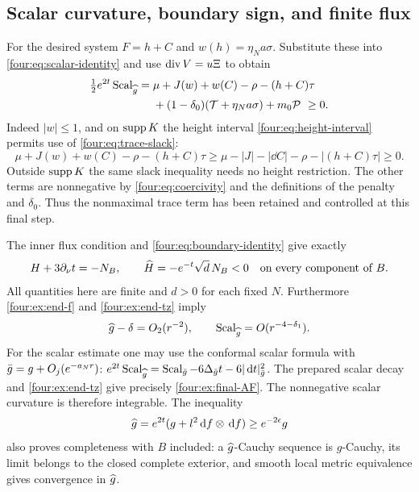 \subsection{Scalar curvature, boundary sign, and finite flux}

For the desired system $F=h+C$ and
$w(h)=\eta_N a\sigma$.  Substitute these into
\eqref{four:eq:scalar-identity} and use $\operatorname{div} V=u\Xi$ to obtain
\begin{equation}\label{four:ex:positive-scalar}
 \begin{split}
 \tfrac12e^{2t}\operatorname{Scal}_{\widehat g}
 ={}&\mu+J(w)+w(C)-\rho-(h+C)\tau\\
 &+(1-\delta_0)(\mathcal T+\eta_N a\sigma)+m_0\mathcal P\ \ge0.
 \end{split}
\end{equation}
Indeed $|w|\le1$, and on $\operatorname{supp} K$ the height interval
\eqref{four:eq:height-interval} permits use of \eqref{four:eq:trace-slack}:
\[
 \mu+J(w)+w(C)-\rho-(h+C)\tau
 \ge\mu-|J|-|\dd C|-\rho-|(h+C)\tau|\ge0.
\]
Outside $\operatorname{supp} K$ the same slack inequality needs no height restriction.
The other terms are nonnegative by \eqref{four:eq:coercivity} and the
definitions of the penalty and $\delta_0$.  Thus the nonmaximal trace
term has been retained and controlled at this final step.

The inner flux condition and \eqref{four:eq:boundary-identity} give exactly
\begin{equation}\label{four:ex:negative-boundary}
 H+3\partial_\nu t=-N_B,
 \qquad \widehat H=-e^{-t}\sqrt d\,N_B<0
 \quad\hbox{on every component of }B.
\end{equation}
All quantities here are finite and $d>0$ for each fixed $N$.
Furthermore \eqref{four:ex:end-f} and \eqref{four:ex:end-tz} imply
\begin{equation}\label{four:ex:final-AF}
 \widehat g-\delta=O_2(r^{-2}),\qquad
 \operatorname{Scal}_{\widehat g}=O(r^{-4-\delta_1}).
\end{equation}
For the scalar estimate one may use the conformal scalar formula
with $\bar g=g+O_j(e^{-a_Nr})$:
$e^{2t}\operatorname{Scal}_{\widehat g}=\operatorname{Scal}_{\bar g}-6\Delta_{\bar g}t
-6|\,\mathrm d t|_{\bar g}^2$.  The prepared scalar decay and
\eqref{four:ex:end-tz} give precisely \eqref{four:ex:final-AF}.
The nonnegative scalar curvature is therefore integrable.
The inequality
\begin{equation}\label{four:ex:metric-comparison}
 \widehat g=e^{2t}(g+l^2\,\mathrm d f\otimes\,\mathrm d f)\ge e^{-2\epsilon}g
\end{equation}
also proves completeness with $B$ included: a $\widehat g$-Cauchy sequence
is $g$-Cauchy, its limit belongs to the closed complete exterior, and
smooth local metric equivalence gives convergence in $\widehat g$.

